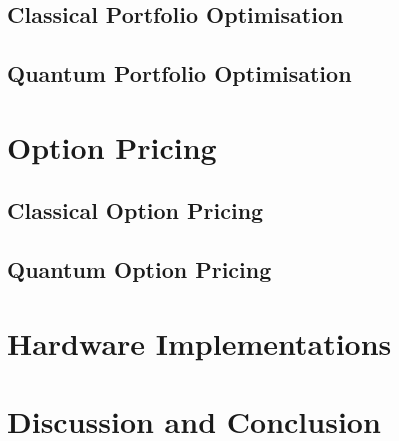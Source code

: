 \documentclass[prx,twocolumn,floatfix,superscriptaddress,longbibliography]{revtex4-1}
\begin{document}
\subsection{Classical Portfolio Optimisation}

\subsection{Quantum Portfolio Optimisation}


\section{Option Pricing}\label{sec:literature2}

\subsection{Classical Option Pricing}

\subsection{Quantum Option Pricing}


\section{Hardware Implementations}\label{sec:hardware}




\section{Discussion and Conclusion}\label{sec:discussion}



\FloatBarrier


\end{document}

